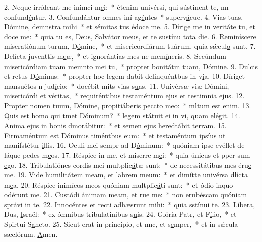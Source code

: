 2. Neque irrídeant me inimci m\uline{e}i:~* étenim univérsi, qui sústinent te, nn confund\uline{é}ntur.
3. Confundántur omnes iní ag\uline{é}ntes~* superv\uline{á}cue.
4. Vias tuas, Dómine, demnstra m\uline{i}hi~* et sémitas tus édoc\uline{e} me.
5. Dírige me in veritáte tu, et d\uline{o}ce me:~* quia tu es, Deus, Salvátor meus, et te sustínu tota d\uline{i}e.
6. Reminíscere miseratiónum turum, D\uline{ó}mine,~* et misericordiárum tuárum, quia  sǽcul\uline{o} sunt.
7. Delícta juventtis m\uline{e}æ,~* et ignorántias mes ne mem\uline{í}neris.
8. Secúndum misericórdiam tuam memnto m\uline{e}i tu,~* propter bonitátm tuam, D\uline{ó}mine.
9. Dulcis et rctus D\uline{ó}minus:~* propter hoc legem dabit delinquéntbus in v\uline{i}a.
10. Díriget mansuétos n jud\uline{í}cio:~* docébit mits vias s\uline{u}as.
11. Univérsæ viæ Dómini, misericórdi et v\uline{é}ritas,~* requiréntibus testaméntum ejus et testimnia \uline{e}jus.
12. Propter nomen tuum, Dómine, propitiáberis peccto m\uline{e}o:~* mltum est \uline{e}nim.
13. Quis est homo qui tmet D\uline{ó}minum?~* legem státuit ei in vi, quam el\uline{é}git.
14. Anima ejus in bonis dmor\uline{á}bitur:~* et semen ejus heredtábit t\uline{e}rram.
15. Firmaméntum est Dóminus timéntbus \uline{e}um:~* et testaméntum ipsíus ut manifstétur \uline{i}llis.
16. Oculi mei sempr ad D\uline{ó}minum:~* quóniam ipse evéllet de láque pedes m\uline{e}os.
17. Réspice in me, et miserre m\uline{e}i:~* quia únicus et pper sum \uline{e}go.
18. Tribulatiónes cordis mei multplic\uline{á}tæ sunt:~* de necessitátibus mes éru\uline{e} me.
19. Vide humilitátem meam, et labrem m\uline{e}um:~* et dimítte univérsa dlícta m\uline{e}a.
20. Réspice inimícos meos quóniam multplic\uline{á}ti sunt:~* et ódio inquo od\uline{é}runt me.
21. Custódi ánimam meam, et ru\uline{e} me:~* non erubéscam quóniam správi \uline{i}n te.
22. Innocéntes et recti adhæsrunt m\uline{i}hi:~* quia sstínu\uline{i} te.
23. Líbera, Dus, \uline{I}sraël:~* ex ómnibus tribulatinibus s\uline{u}is.
24. Glória Patr, et F\uline{í}lio,~* et Spirtui S\uline{a}ncto.
25. Sicut erat in princípio, et nnc, et s\uline{e}mper,~* et in sǽcula sæclórum. \uline{A}men.
